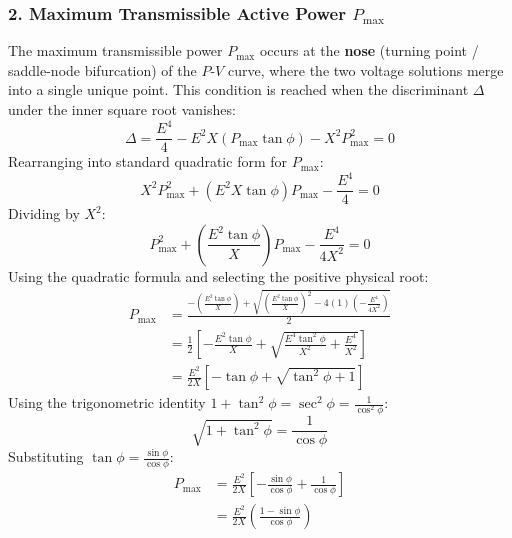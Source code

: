 \subsubsection*{2. Maximum Transmissible Active Power $P_{\text{max}}$}
The maximum transmissible power $P_{\text{max}}$ occurs at the \textbf{nose} (turning point / saddle-node bifurcation) of the $P$-$V$ curve, where the two voltage solutions merge into a single unique point.
This condition is reached when the discriminant $\Delta$ under the inner square root vanishes:
\begin{equation}
    \Delta = \frac{E^4}{4} - E^2 X (P_{\text{max}}\tan\phi) - X^2 P_{\text{max}}^2 = 0
\end{equation}
Rearranging into standard quadratic form for $P_{\text{max}}$:
\begin{equation}
    X^2 P_{\text{max}}^2 + (E^2 X \tan\phi) P_{\text{max}} - \frac{E^4}{4} = 0
\end{equation}
Dividing by $X^2$:
\begin{equation}
    P_{\text{max}}^2 + \left(\frac{E^2 \tan\phi}{X}\right) P_{\text{max}} - \frac{E^4}{4 X^2} = 0
\end{equation}
Using the quadratic formula and selecting the positive physical root:
\begin{align}
    P_{\text{max}} &= \frac{-\left(\frac{E^2\tan\phi}{X}\right) + \sqrt{\left(\frac{E^2\tan\phi}{X}\right)^2 - 4(1)\left(-\frac{E^4}{4X^2}\right)}}{2} \nonumber\\
                   &= \frac{1}{2} \left[ -\frac{E^2\tan\phi}{X} + \sqrt{\frac{E^4\tan^2\phi}{X^2} + \frac{E^4}{X^2}} \right] \nonumber\\
                   &= \frac{E^2}{2X} \left[ -\tan\phi + \sqrt{\tan^2\phi + 1} \right]
\end{align}
Using the trigonometric identity $1 + \tan^2\phi = \sec^2\phi = \frac{1}{\cos^2\phi}$:
\begin{equation}
    \sqrt{1 + \tan^2\phi} = \frac{1}{\cos\phi}
\end{equation}
Substituting $\tan\phi = \frac{\sin\phi}{\cos\phi}$:
\begin{align}
    P_{\text{max}} &= \frac{E^2}{2X} \left[ -\frac{\sin\phi}{\cos\phi} + \frac{1}{\cos\phi} \right] \nonumber\\
                   &= \boxed{\frac{E^2}{2X} \left( \frac{1 - \sin\phi}{\cos\phi} \right)} \label{eq:tp6_Pmax}
\end{align}

